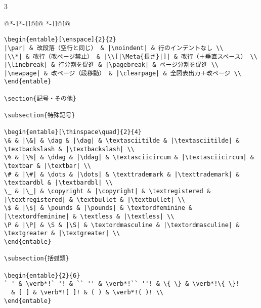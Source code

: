 \documentclass[10pt,a4paper,landscape,dvipdfmx,nomag]{jsarticle}
\makeatletter
\def\set@etsep#1#2{\def\etcolsep{#1}\def\etitemsep{#2}}
\newenvironment{entable}[3][\quad\qquad]{%
  \set@etsep#1\relax\relax
  \begin{tabular}{%
    @{}*{\the\numexpr#3-1}{*{\the\numexpr#2-1}{l@{\etcolsep}}l@{\etitemsep}}%
    *{\the\numexpr#2-1}{l@{\etcolsep}}l@{}}}{%
  \end{tabular}}
\newcommand{\Meta}[1]{$\langle$\mbox{}\emph{#1}\mbox{}$\rangle$}
\makeatother
\begin{document}
\begin{multicols}{3}
\begin{entable}[\enspace]{2}{1}
\begin{verbatim}
\begin{entable}[\enspace]{2}{2}
|\par| & 改段落（空行と同じ） & |\noindent| & 行のインデントなし \\
|\\*| & 改行（改ページ禁止） & |\\[|\Meta{長さ}|]| & 改行（＋垂直スペース） \\
|\linebreak| & 行分割を促進 & |\pagebreak| & ページ分割を促進 \\
|\newpage| & 改ページ（段移動） & |\clearpage| & 全図表出力＋改ページ \\
\end{entable}

\section{記号・その他}

\subsection{特殊記号}

\begin{entable}[\thinspace\quad]{2}{4}
\& & |\&| & \dag & |\dag| & \textasciitilde & |\textasciitilde| & \textbackslash & |\textbackslash| \\
\% & |\%| & \ddag & |\ddag| & \textasciicircum & |\textasciicircum| & \textbar & |\textbar| \\
\# & |\#| & \dots & |\dots| & \texttrademark & |\texttrademark| & \textbardbl & |\textbardbl| \\
\_ & |\_| & \copyright & |\copyright| & \textregistered & |\textregistered| & \textbullet & |\textbullet| \\
\$ & |\$| & \pounds & |\pounds| & \textordfeminine & |\textordfeminine| & \textless & |\textless| \\
\P & |\P| & \S & |\S| & \textordmasculine & |\textordmasculine| & \textgreater & |\textgreater| \\
\end{entable}

\subsection{括弧類}

\begin{entable}{2}{6}
` ' & \verb*!` '! & `` '' & \verb*!`` ''! & \{ \} & \verb*!\{ \}!
  & [ ] & \verb*![ ]! & ( ) & \verb*!( )! \\
\end{entable}


\end{verbatim}
\end{entable}
\end{multicols}
\end{document}
